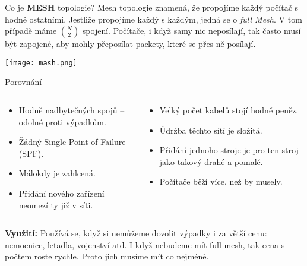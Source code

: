 \documentclass{beamer}
\begin{document}
\begin{frame}{Co je \textbf{MESH} topologie?}
 Mesh topologie znamená, že propojíme každý počítač s hodně ostatními. Jestliže
 propojíme každý s každým, jedná se o \emph{full Mesh}. V tom případě máme
 $\binom{N}{2}$ spojení. Počítače, i když samy nic neposílají, tak často musí
 být zapojené, aby mohly přeposílat packety, které se přes ně posílají.

 \texttt{[image: mash.png]}

\end{frame}
\begin{frame}{Porovnání}

\begin{columns}
    \begin{column}{0.45\textwidth}
        \begin{itemize}
            \item Hodně nadbytečných spojů -- odolné proti výpadkům.
            \item Žádný Single Point of Failure (SPF). 
            \item Málokdy je zahlcená.
            \item Přidání nového zařízení neomezí ty již v síti.
        \end{itemize}
    \end{column}
    \begin{column}{0.45\textwidth}  %
        \begin{itemize}
            \item Velký počet kabelů stojí hodně peněz.
            \item Údržba těchto sítí je složitá.
            \item Přidání jednoho stroje je pro ten stroj jako takový drahé a
             pomalé.
            \item Počítače běží více, než by musely.
        \end{itemize}
    \end{column}
    \end{columns}
    \vspace{10pt}

\textbf{Využití:} Používá se, když si nemůžeme dovolit výpadky i za větší cenu:
nemocnice, letadla, vojenství atd. I když nebudeme mít full mesh, tak cena s
počtem roste rychle. Proto jich musíme mít co nejméně.
 
\end{frame}
\end{document}
